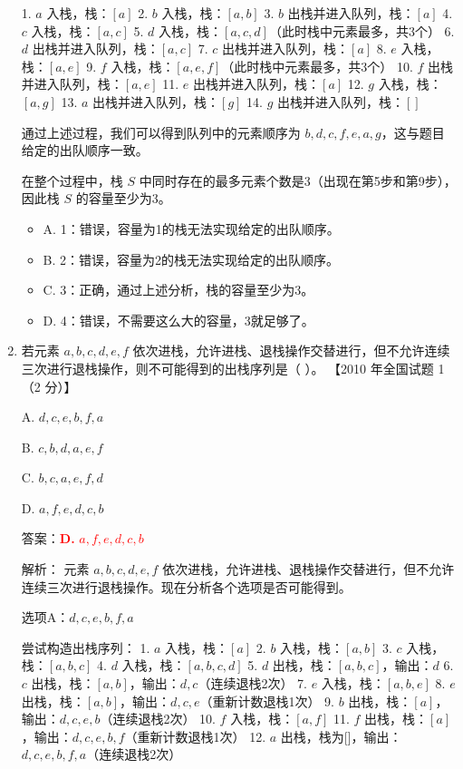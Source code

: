 \documentclass[lang=cn,newtx,10pt,scheme=chinese]{../../../elegantbook}
\begin{document}
\begin{enumerate}
    1. $a$ 入栈，栈：$[a]$
    2. $b$ 入栈，栈：$[a, b]$
    3. $b$ 出栈并进入队列，栈：$[a]$
    4. $c$ 入栈，栈：$[a, c]$
    5. $d$ 入栈，栈：$[a, c, d]$（此时栈中元素最多，共3个）
    6. $d$ 出栈并进入队列，栈：$[a, c]$
    7. $c$ 出栈并进入队列，栈：$[a]$
    8. $e$ 入栈，栈：$[a, e]$
    9. $f$ 入栈，栈：$[a, e, f]$（此时栈中元素最多，共3个）
    10. $f$ 出栈并进入队列，栈：$[a, e]$
    11. $e$ 出栈并进入队列，栈：$[a]$
    12. $g$ 入栈，栈：$[a, g]$
    13. $a$ 出栈并进入队列，栈：$[g]$
    14. $g$ 出栈并进入队列，栈：$[]$

    通过上述过程，我们可以得到队列中的元素顺序为 $b, d, c, f, e, a, g$，这与题目给定的出队顺序一致。

    在整个过程中，栈 $S$ 中同时存在的最多元素个数是3（出现在第5步和第9步），因此栈 $S$ 的容量至少为3。

    \begin{itemize}
        \item A. 1：错误，容量为1的栈无法实现给定的出队顺序。
        \item B. 2：错误，容量为2的栈无法实现给定的出队顺序。
        \item C. 3：正确，通过上述分析，栈的容量至少为3。
        \item D. 4：错误，不需要这么大的容量，3就足够了。
    \end{itemize}

    \item 若元素 $a, b, c, d, e,f$ 依次进栈，允许进栈、退栈操作交替进行，但不允许连续三次进行退栈操作，则不可能得到的出栈序列是（ ）。  
    【2010 年全国试题 1（2 分）】  

    A. $d, c, e, b,f, a$  

    B. $c, b, d, a, e,f$  

    C. $b,c, a, e,f, d $  

    D. $a,f,e,d,c,b$  

    答案：\textcolor{red}{\textbf{D.} $a,f,e,d,c,b$}

    解析：
    元素 $a, b, c, d, e, f$ 依次进栈，允许进栈、退栈操作交替进行，但不允许连续三次进行退栈操作。现在分析各个选项是否可能得到。

    选项A：$d, c, e, b, f, a$
    
    尝试构造出栈序列：
    1. $a$ 入栈，栈：$[a]$
    2. $b$ 入栈，栈：$[a, b]$
    3. $c$ 入栈，栈：$[a, b, c]$
    4. $d$ 入栈，栈：$[a, b, c, d]$
    5. $d$ 出栈，栈：$[a, b, c]$，输出：$d$
    6. $c$ 出栈，栈：$[a, b]$，输出：$d, c$（连续退栈2次）
    7. $e$ 入栈，栈：$[a, b, e]$
    8. $e$ 出栈，栈：$[a, b]$，输出：$d, c, e$（重新计数退栈1次）
    9. $b$ 出栈，栈：$[a]$，输出：$d, c, e, b$（连续退栈2次）
    10. $f$ 入栈，栈：$[a, f]$
    11. $f$ 出栈，栈：$[a]$，输出：$d, c, e, b, f$（重新计数退栈1次）
    12. $a$ 出栈，栈为[]，输出：$d, c, e, b, f, a$（连续退栈2次）
    

\end{enumerate}
\end{document}
